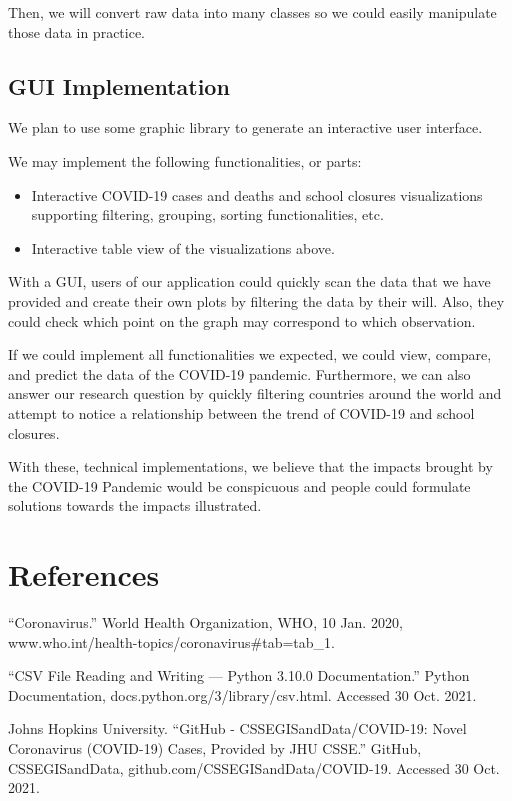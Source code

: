 \documentclass[fontsize=11pt]{article}
\begin{document}
Then, we will convert raw data into many classes so we could easily manipulate those data in practice.

\subsection*{GUI Implementation}

We plan to use some graphic library to generate an interactive user interface.

We may implement the following functionalities, or parts:

\begin{itemize}
    \item Interactive COVID-19 cases and deaths and school closures visualizations supporting filtering, grouping, sorting functionalities, etc.
    \item Interactive table view of the visualizations above.
\end{itemize}

With a GUI, users of our application could quickly scan the data that we have provided and create their own plots by filtering the data by their will. Also, they could check which point on the graph may correspond to which observation.

If we could implement all functionalities we expected, we could view, compare, and predict the data of the COVID-19 pandemic. Furthermore, we can also answer our research question by quickly filtering countries around the world and attempt to notice a relationship between the trend of COVID-19 and school closures.

With these, technical implementations, we believe that the impacts brought by the COVID-19 Pandemic would be conspicuous and people could formulate solutions towards the impacts illustrated.

\newpage

\section*{References}

“Coronavirus.” World Health Organization, WHO, 10 Jan. 2020, www.who.int/health-topics/coronavirus\#tab=tab\_1.

“CSV File Reading and Writing — Python 3.10.0 Documentation.” Python Documentation, docs.python.org/3/library/csv.html. Accessed 30 Oct. 2021.

Johns Hopkins University. “GitHub - CSSEGISandData/COVID-19: Novel Coronavirus (COVID-19) Cases, Provided by JHU CSSE.” GitHub, CSSEGISandData, github.com/CSSEGISandData/COVID-19. Accessed 30 Oct. 2021.
\end{document}
